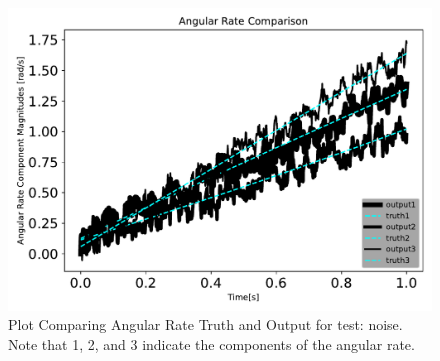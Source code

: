 \begin{figure}[htbp]\centerline{\includegraphics[height=0.7\textwidth, keepaspectratio]{AutoTeX/noiseomegaComparison}}\caption{Plot Comparing Angular Rate Truth and Output for test: noise. Note that 1, 2, and 3 indicate the components of the angular rate.}\label{fig:noiseomegaComparison}\end{figure}